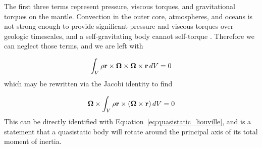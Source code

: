 \documentclass[extra,mreferee]{gji}
\newif\ifdetail
\begin{document}
The first three terms represent pressure, viscous torques, and gravitational torques on the mantle.  
Convection in the outer core, atmospheres, and oceans is not strong enough to provide significant pressure and viscous torques over geologic timescales, and a self-gravitating body cannot self-torque \citep{braginsky1995equations}.
Therefore we can neglect those terms, and we are left with

\begin{equation}
\begin{aligned}
\int_V \rho \mathbf{r} \times \mitbf{\Omega} \times \mitbf{\Omega} \times \mathbf{r} \,dV &= 0 \\
\label{eq:quasistatic_angular_momentum}
\end{aligned}
\end{equation}
which may be rewritten via the Jacobi identity to find
\ifdetail
\begin{equation}
\begin{aligned}
- \int_V \rho (\mitbf{\Omega}\times \mathbf{r}) \times ( \mathbf{r} \times \mitbf{\Omega} ) \,dV + 
- \int_V \rho \mitbf{\Omega}\times(\mitbf{\Omega}\times \mathbf{r}) \times \mathbf{r} \,dV &= 0 \\
\end{aligned}
\end{equation}
\fi
\begin{equation}
\begin{aligned}
 \mitbf{\Omega} \times \int_V \rho \mathbf{r} \times (\mitbf{\Omega}\times \mathbf{r}) \,dV &= 0 \\
\end{aligned}
\end{equation}
This can be directly identified with Equation~\eqref{eq:quasistatic_liouville},
and is a statement that a quasistatic body will rotate around the principal axis of its total moment of inertia.
\end{document}
